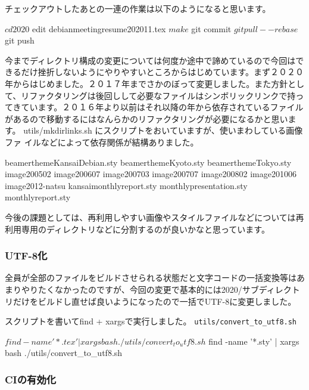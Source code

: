 \documentclass[mingoth,a4paper]{jsarticle}
\begin{document}
チェックアウトしたあとの一連の作業は以下のようになると思います。

\begin{commandline}
$ cd 2020
$ edit debianmeetingresume202011.tex
$ make
$ git commit 
$ git pull --rebase
$ git push
 \end{commandline}

今までディレクトリ構成の変更については何度か途中で諦めているので今回はで
きるだけ挫折しないようにやりやすいところからはじめています。まず２０２０
年からはじめました。２０１７年までさかのぼって変更しました。また方針とし
て、リファクタリングは後回しして必要なファイルはシンボリックリンクで持っ
てきています。２０１６年より以前はそれ以降の年から依存されているファイル
があるので移動するにはなんらかのリファクタリングが必要になるかと思います。
utils/mkdirlinks.sh にスクリプトをおいていますが、使いまわしている画像ファ
イルなどによって依存関係が結構ありました。

\begin{commandline}
    beamerthemeKansaiDebian.sty
    beamerthemeKyoto.sty
    beamerthemeTokyo.sty
    image200502
    image200607
    image200703
    image200707
    image200802
    image201006
    image2012-natsu
    kansaimonthlyreport.sty
    monthlypresentation.sty
    monthlyreport.sty
\end{commandline}

今後の課題としては、再利用しやすい画像やスタイルファイルなどについては再
利用専用のディレクトリなどに分割するのが良いかなと思っています。

\subsubsection{UTF-8化}

全員が全部のファイルをビルドさせられる状態だと文字コードの一括変換等はあ
まりやりたくなかったのですが、今回の変更で基本的には2020/サブディレクト
リだけをビルドし直せば良いようになったので一括でUTF-8に変更しました。

スクリプトを書いてfind + xargsで実行しました。
\verb!utils/convert_to_utf8.sh!

\begin{commandline}
$ find -name '*.tex' | xargs bash ./utils/convert_to_utf8.sh
$ find -name '*.sty' | xargs bash ./utils/convert_to_utf8.sh
\end{commandline}

\subsubsection{CIの有効化}
\end{document}
